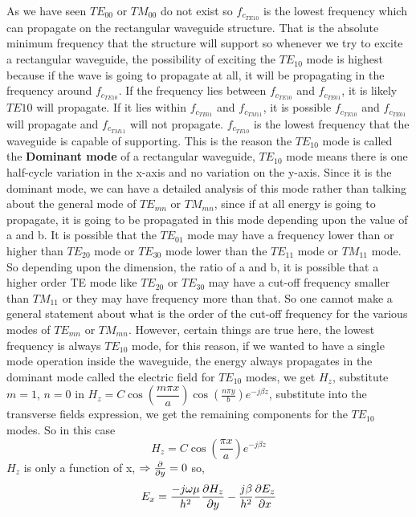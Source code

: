As we have seen $TE_{00}$ or $TM_{00}$ do not exist so $f_{c_{TE{10}}}$ is the lowest frequency which can propagate on the rectangular waveguide structure. That is the absolute minimum frequency that the structure will support so whenever we try to excite a rectangular waveguide, the possibility of exciting the $TE_{10}$ mode is highest because if the wave is going to propagate at all, it will be propagating in the frequency around $f_{c_{TE{10}}}$. If the frequency lies between $f_{c_{TE{10}}}$ and $f_{c_{TE{01}}}$, it is likely $TE{10}$ will propagate. If it lies within $f_{c_{TE{01}}}$ and $f_{c_{TM{11}}}$, it is possible  $f_{c_{TE{10}}}$ and $f_{c_{TE{01}}}$ will propagate and $f_{c_{TM{11}}}$ will not propagate. $f_{c_{TE{10}}}$ is the lowest frequency that the waveguide is capable of supporting. This is the reason the $TE_{10}$ mode is called the \textbf{Dominant mode} of a rectangular waveguide, $TE_{10}$ mode means there is one half-cycle variation in the x-axis and no variation on the y-axis. Since it is the dominant mode, we can have a detailed analysis of this mode rather than talking about the general mode of $TE_{mn}$ or $TM_{mn}$, since if at all energy is going to propagate, it is going to be propagated in this mode depending upon the value of a and b. It is possible that the $TE_{01}$ mode may have a frequency lower than or higher than $TE_{20}$ mode or $TE_{30}$ mode lower than the $TE_{11}$ mode or $TM_{11}$ mode. So depending upon the dimension, the ratio of a and b, it is possible that a higher order TE mode like $TE_{20}$ or $TE_{30}$ may have a cut-off frequency smaller than $TM_{11}$ or they may have frequency more than that. So one cannot make a general statement about what is the order of the cut-off frequency for the various modes of $TE_{mn}$ or $TM_{mn}$. However, certain things are true here, the lowest frequency is always $TE_{10}$ mode, for this reason, if we wanted to have a single mode operation inside the waveguide, the energy always propagates in the dominant mode called the electric field for $TE_{10}$ modes, we get $H_z$, substitute $m=1$, $n=0$ in $H_z = C \cos(\dfrac{m\pi x}{a})\cos(\frac{n\pi y}{b})e^{-j\beta z}$, substitute into the transverse fields expression, we get the remaining components for the $TE_{10}$ modes. So in this case
\begin{dmath*}
H_z = C\cos(\frac{\pi x}{a})e^{-j\beta z}
\end{dmath*}
$H_z$ is only a function of x, $\Rightarrow \pdv{}{y} = 0$ so,
\begin{dmath*}
E_x = \frac{-j\omega\mu}{h^2}\pdv{H_z}{y} - \frac{j\beta}{h^2}\pdv{E_z}{x}
\end{dmath*}
